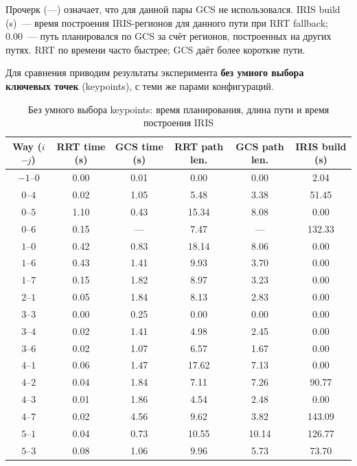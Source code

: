 \documentclass[a4paper]{article}
\begin{document}
Прочерк (---) означает, что для данной пары GCS не использовался. IRIS build (s)~--- время построения IRIS-регионов для данного пути при RRT fallback; 0.00~--- путь планировался по GCS за счёт регионов, построенных на других путях. RRT по времени часто быстрее; GCS даёт более короткие пути.

\medskip

Для сравнения приводим результаты эксперимента \textbf{без умного выбора ключевых точек} (keypoints), с теми же парами конфигураций.

\begin{table}[htbp]
\centering
\caption{Без умного выбора keypoints: время планирования, длина пути и время построения IRIS}
\label{tab:online-gcs-rrt-gcs-nosmart}
\begin{tabular}{c S[table-format=1.2] S[table-format=1.2] S[table-format=2.2] S[table-format=2.2] S[table-format=3.2]}
\toprule
{Way ($i$--$j$)} & {RRT time (s)} & {GCS time (s)} & {RRT path len.} & {GCS path len.} & {IRIS build (s)} \\
\midrule
$-1$--$0$  & 0.00 & 0.01 & 0.00 & 0.00 & 2.04 \\
$0$--$4$   & 0.02 & 1.05 & 5.48 & 3.38 & 51.45 \\
$0$--$5$   & 1.10 & 0.43 & 15.34 & 8.08 & 0.00 \\
$0$--$6$   & 0.15 &  & 7.47 &  & 132.33 \\
$1$--$0$   & 0.42 & 0.83 & 18.14 & 8.06 & 0.00 \\
$1$--$6$   & 0.43 & 1.41 & 9.93 & 3.70 & 0.00 \\
$1$--$7$   & 0.15 & 1.82 & 8.97 & 3.23 & 0.00 \\
$2$--$1$   & 0.05 & 1.84 & 8.13 & 2.83 & 0.00 \\
$3$--$3$   & 0.00 & 0.25 & 0.00 & 0.00 & 0.00 \\
$3$--$4$   & 0.02 & 1.41 & 4.98 & 2.45 & 0.00 \\
$3$--$6$   & 0.02 & 1.07 & 6.57 & 1.67 & 0.00 \\
$4$--$1$   & 0.06 & 1.47 & 17.62 & 7.13 & 0.00 \\
$4$--$2$   & 0.04 & 1.84 & 7.11 & 7.26 & 90.77 \\
$4$--$3$   & 0.01 & 1.86 & 4.54 & 2.48 & 0.00 \\
$4$--$7$   & 0.02 & 4.56 & 9.62 & 3.82 & 143.09 \\
$5$--$1$   & 0.04 & 0.73 & 10.55 & 10.14 & 126.77 \\
$5$--$3$   & 0.08 & 1.06 & 9.96 & 5.73 & 73.70 \\

\end{tabular}
\end{table}
\end{document}

